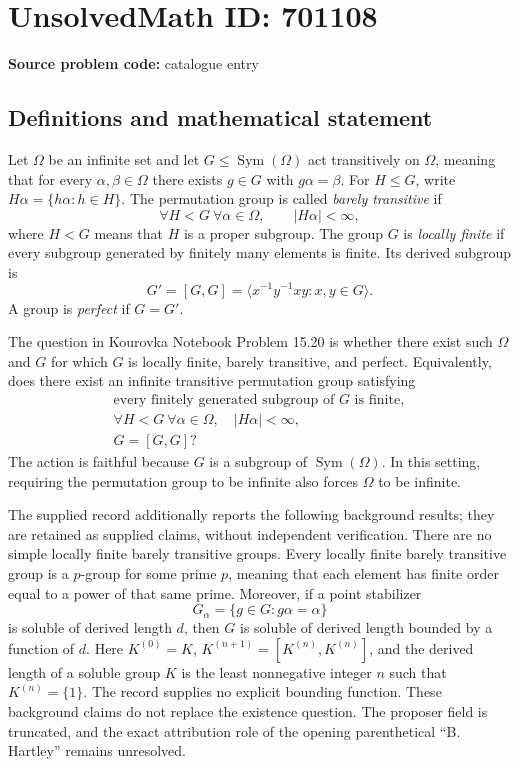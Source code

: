 \documentclass[11pt]{article}
\begin{document}
\section*{UnsolvedMath ID: 701108}
\textbf{Source problem code:} catalogue entry
\subsection{Definitions and mathematical statement}
Let \(\Omega\) be an infinite set and let \(G\leq\operatorname{Sym}(\Omega)\) act transitively on \(\Omega\), meaning that for every \(\alpha,\beta\in\Omega\) there exists \(g\in G\) with \(g\alpha=\beta\). For \(H\leq G\), write \(H\alpha=\{h\alpha:h\in H\}\). The permutation group is called \emph{barely transitive} if
\[
\forall H<G\ \forall\alpha\in\Omega,\qquad |H\alpha|<\infty,
\]
where \(H<G\) means that \(H\) is a proper subgroup. The group \(G\) is \emph{locally finite} if every subgroup generated by finitely many elements is finite. Its derived subgroup is
\[
G'=[G,G]=\langle x^{-1}y^{-1}xy:x,y\in G\rangle.
\]
A group is \emph{perfect} if \(G=G'\).

The question in Kourovka Notebook Problem 15.20 is whether there exist such \(\Omega\) and \(G\) for which \(G\) is locally finite, barely transitive, and perfect. Equivalently, does there exist an infinite transitive permutation group satisfying
\[
\begin{gathered}
\text{every finitely generated subgroup of }G\text{ is finite},\\
\forall H<G\ \forall\alpha\in\Omega,\quad |H\alpha|<\infty,\\
G=[G,G]?
\end{gathered}
\]
The action is faithful because \(G\) is a subgroup of \(\operatorname{Sym}(\Omega)\). In this setting, requiring the permutation group to be infinite also forces \(\Omega\) to be infinite.

The supplied record additionally reports the following background results; they are retained as supplied claims, without independent verification. There are no simple locally finite barely transitive groups. Every locally finite barely transitive group is a \(p\)-group for some prime \(p\), meaning that each element has finite order equal to a power of that same prime. Moreover, if a point stabilizer
\[
G_\alpha=\{g\in G:g\alpha=\alpha\}
\]
is soluble of derived length \(d\), then \(G\) is soluble of derived length bounded by a function of \(d\). Here \(K^{(0)}=K\), \(K^{(n+1)}=[K^{(n)},K^{(n)}]\), and the derived length of a soluble group \(K\) is the least nonnegative integer \(n\) such that \(K^{(n)}=\{1\}\). The record supplies no explicit bounding function. These background claims do not replace the existence question. The proposer field is truncated, and the exact attribution role of the opening parenthetical ``B. Hartley'' remains unresolved.
\end{document}
